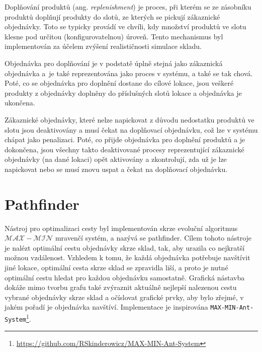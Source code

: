 
Doplňování produktů (ang. \emph{replenishment}) je proces, při kterém se ze zásobníku produktů doplňují produkty do slotů, ze kterých se pickují zákaznické objednávky. Toto se typicky provádí ve chvíli, kdy množství produktů ve slotu klesne pod určitou (konfigurovatelnou) úroveň. Tento mechanismus byl implementován za účelem zvýšení realističnosti simulace skladu.

Objednávka pro doplňování je v podstatě úplně stejná jako zákaznická objednávka a~je také reprezentována jako proces v systému, a také se tak chová. Poté, co se objednávka pro doplnění dostane do cílové lokace, jsou veškeré produkty z objednávky doplněny do příslušných slotů lokace a objednávka je ukončena.

Zákaznické objednávky, které nelze napickovat z důvodu nedostatku produktů ve slotu jsou deaktivovány a musí čekat na doplňovací objednávku, což lze v systému chápat jako penalizaci. Poté, co přijde objednávka pro doplnění produktů a je dokončena, jsou všechny takto deaktivované procesy reprezentující zákaznické objednávky (na dané lokaci) opět aktivovány a zkontrolují, zda už je lze napickovat nebo se musí znovu uspat a čekat na  doplňovací objednávku.



\section{Pathfinder}
\label{sec:pathFinder}
Nástroj pro optimalizaci cesty byl implementován skrze evoluční algoritmus $\mathcal{MAX}\!{-}\!\mathcal{MIN}$ mravenčí systém, a nazývá se pathfinder. Cílem tohoto nástroje je nalézt optimální cestu objednávky skrze sklad, tak, aby urazila co nejkratší možnou vzdálenost. Vzhledem k tomu, že každá objednávka potřebuje navštívit jiné lokace, optimální cesta skrze sklad se zpravidla liší, a proto je nutné optimální cestu hledat pro každou objednávku samostatně. Grafická nástavba dokáže mimo tvorbu grafu také zvýraznit aktuálně nejlepší nalezenou cestu vybrané objednávky skrze sklad a očíslovat grafické prvky, aby bylo zřejmé, v jakém pořadí je objednávka navštíví. Implementace je inspirována \texttt{MAX-MIN-Ant-System}\footnote{\url{https://github.com/RSkinderowicz/MAX-MIN-Ant-System}}.

